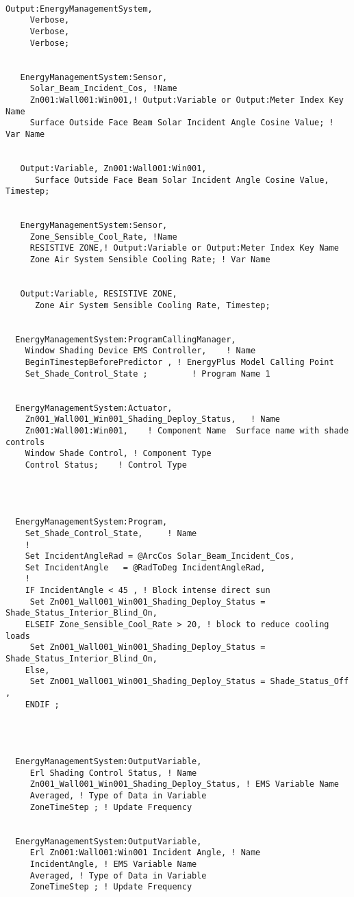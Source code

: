 \begin{lstlisting}

Output:EnergyManagementSystem,
     Verbose,
     Verbose,
     Verbose;


   EnergyManagementSystem:Sensor,
     Solar_Beam_Incident_Cos, !Name
     Zn001:Wall001:Win001,! Output:Variable or Output:Meter Index Key Name
     Surface Outside Face Beam Solar Incident Angle Cosine Value; ! Var Name


   Output:Variable, Zn001:Wall001:Win001,
      Surface Outside Face Beam Solar Incident Angle Cosine Value, Timestep;


   EnergyManagementSystem:Sensor,
     Zone_Sensible_Cool_Rate, !Name
     RESISTIVE ZONE,! Output:Variable or Output:Meter Index Key Name
     Zone Air System Sensible Cooling Rate; ! Var Name


   Output:Variable, RESISTIVE ZONE,
      Zone Air System Sensible Cooling Rate, Timestep;


  EnergyManagementSystem:ProgramCallingManager,
    Window Shading Device EMS Controller,    ! Name
    BeginTimestepBeforePredictor , ! EnergyPlus Model Calling Point
    Set_Shade_Control_State ;         ! Program Name 1


  EnergyManagementSystem:Actuator,
    Zn001_Wall001_Win001_Shading_Deploy_Status,   ! Name
    Zn001:Wall001:Win001,    ! Component Name  Surface name with shade controls
    Window Shade Control, ! Component Type
    Control Status;    ! Control Type




  EnergyManagementSystem:Program,
    Set_Shade_Control_State,     ! Name
    !
    Set IncidentAngleRad = @ArcCos Solar_Beam_Incident_Cos,
    Set IncidentAngle   = @RadToDeg IncidentAngleRad,
    !
    IF IncidentAngle < 45 , ! Block intense direct sun
     Set Zn001_Wall001_Win001_Shading_Deploy_Status = Shade_Status_Interior_Blind_On,
    ELSEIF Zone_Sensible_Cool_Rate > 20, ! block to reduce cooling loads
     Set Zn001_Wall001_Win001_Shading_Deploy_Status = Shade_Status_Interior_Blind_On,
    Else,
     Set Zn001_Wall001_Win001_Shading_Deploy_Status = Shade_Status_Off ,
    ENDIF ;




  EnergyManagementSystem:OutputVariable,
     Erl Shading Control Status, ! Name
     Zn001_Wall001_Win001_Shading_Deploy_Status, ! EMS Variable Name
     Averaged, ! Type of Data in Variable
     ZoneTimeStep ; ! Update Frequency


  EnergyManagementSystem:OutputVariable,
     Erl Zn001:Wall001:Win001 Incident Angle, ! Name
     IncidentAngle, ! EMS Variable Name
     Averaged, ! Type of Data in Variable
     ZoneTimeStep ; ! Update Frequency



\end{lstlisting}
